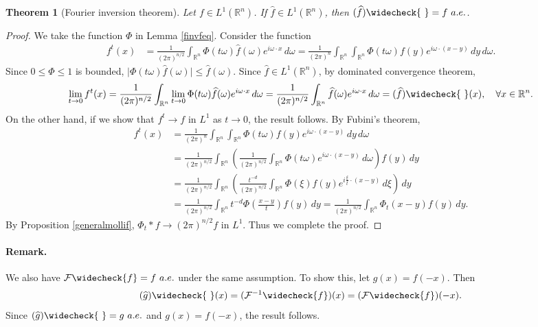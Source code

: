 \documentclass{article}
\numberwithin{equation}{section}
\newcommand{\bbR}{\mathbb{R}}
\renewcommand{\cal}{\mathcal}
\newcommand{\wh}{\widehat}
\theoremstyle{plain}
\newtheorem{theorem}{Theorem}[section]
\theoremstyle{definition}
\begin{document}
\begin{theorem}[Fourier inversion theorem]\label{fourierinversion}
Let $f\in L^1(\bbR^n)$. If $\wh{f}\in L^1(\bbR^n)$, then $(\wh{f})\widecheck{\ }=f\ a.e.$.
\end{theorem}
\begin{proof}
We take the function $\Phi$ in Lemma \ref{finvfeq}. Consider the function
\begin{align*}
	f^t(x)&=\frac{1}{(2\pi)^{n/2}}\int_{\bbR^n}\Phi(t\omega)\wh{f}(\omega)e^{i\omega\cdot x}\,d\omega=\frac{1}{(2\pi)^n}\int_{\bbR^n}\int_{\bbR^n}\Phi(t\omega)f(y)e^{i\omega\cdot(x-y)}\,dy\,d\omega.
\end{align*}
Since $0\leq\Phi\leq 1$ is bounded, $\vert \Phi(t\omega)\wh{f}(\omega)\vert\leq\wh{f}(\omega)$. Since $\wh{f}\in L^1(\bbR^n)$, by dominated convergence theorem,
\begin{align*}
	\lim_{t\to 0}f^t(x)=\frac{1}{(2\pi)^{n/2}}\int_{\bbR^n}\lim_{t\to 0}\Phi(t\omega)\wh{f}(\omega)e^{i\omega\cdot x}\,d\omega=\frac{1}{(2\pi)^{n/2}}\int_{\bbR^n}\wh{f}(\omega)e^{i\omega\cdot x}\,d\omega=(\wh{f})\widecheck{\ }(x),\quad\forall x\in\bbR^n.
\end{align*}
On the other hand, if we show that $f^t\to f$ in $L^1$ as $t\to 0$, the result follows. By Fubini's theorem,
\begin{align*}
	f^t(x)&=\frac{1}{(2\pi)^n}\int_{\bbR^n}\int_{\bbR^n}\Phi(t\omega)f(y)e^{i\omega\cdot(x-y)}\,dy\,d\omega\\
	&=\frac{1}{(2\pi)^{n/2}}\int_{\bbR^n}\left(\frac{1}{(2\pi)^{n/2}}\int_{\bbR^n}\Phi(t\omega)e^{i\omega\cdot(x-y)}\,d\omega\right)f(y)\,dy\\
	&=\frac{1}{(2\pi)^{n/2}}\int_{\bbR^n}\left(\frac{t^{-d}}{(2\pi)^{n/2}}\int_{\bbR^n}\Phi(\xi)f(y)e^{i\frac{\xi}{t}\cdot(x-y)}\,d\xi\right)\,dy\\
	&=\frac{1}{(2\pi)^{n/2}}\int_{\bbR^n}t^{-d}\Phi\left(\frac{x-y}{t}\right)f(y)\,dy=\frac{1}{(2\pi)^{n/2}}\int_{\bbR^n}\Phi_t\left(x-y\right)f(y)\,dy.
\end{align*}
By Proposition \ref{generalmollif}, $\Phi_t * f\to(2\pi)^{n/2} f$ in $L^1$. Thus we complete the proof.
\end{proof}
\paragraph{Remark.} We also have $\cal{F}\widecheck{f}=f\ a.e.$ under the same assumption. To show this, let $g(x)=f(-x)$. Then
\begin{align*}
	(\wh{g})\widecheck{\ }(x)=(\cal{F}^{-1}\widecheck{f})(x)=(\cal{F}\widecheck{f})(-x).
\end{align*}
Since $(\wh{g})\widecheck{\ }=g\ a.e.$ and $g(x)=f(-x)$, the result follows.
\end{document}
